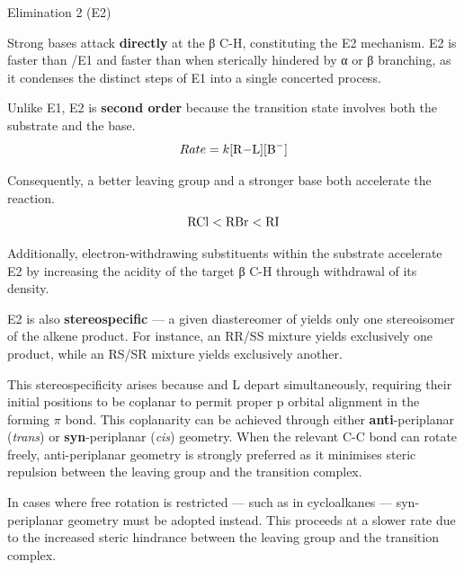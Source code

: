 \documentclass[10pt]{article}
\begin{document}
  \begin{core}{Elimination 2 (E2)}

    Strong bases attack  \textbf{directly} at the β C-H, constituting the E2 mechanism. E2 is faster than \sno/E1 and faster than \snt when sterically hindered by α or β branching, as it condenses the distinct steps of E1 into a single concerted process.


    Unlike E1, E2 is \textbf{second order} because the transition state involves both the substrate and the base.
    \[
      Rate = k[\ce{R-L}][\ce{B-}]
    \]

    Consequently, a better leaving group and a stronger base both accelerate the reaction.
    \[
      \ce{RCl} < \ce{RBr} < \ce{RI}
    \]

    Additionally, electron-withdrawing substituents within the substrate accelerate E2 by increasing the acidity of the target β C-H through withdrawal of its  density.


    E2 is also \textbf{stereospecific} --- a given diastereomer of  yields only one stereoisomer of the alkene product. For instance, an RR/SS mixture yields exclusively one product, while an RS/SR mixture yields exclusively another.



    This stereospecificity arises because  and L depart simultaneously, requiring their initial positions to be coplanar to permit proper p orbital alignment in the forming $\pi$ bond. This coplanarity can be achieved through either \textbf{anti}-periplanar (\textit{trans}) or \textbf{syn}-periplanar (\textit{cis}) geometry. When the relevant C-C bond can rotate freely, anti-periplanar geometry is strongly preferred as it minimises steric repulsion between the leaving group and the  transition complex.

    In cases where free rotation is restricted --- such as in cycloalkanes --- syn-periplanar geometry must be adopted instead. This proceeds at a slower rate due to the increased steric hindrance between the leaving group and the  transition complex. 


  \end{core}
  
\end{document}
